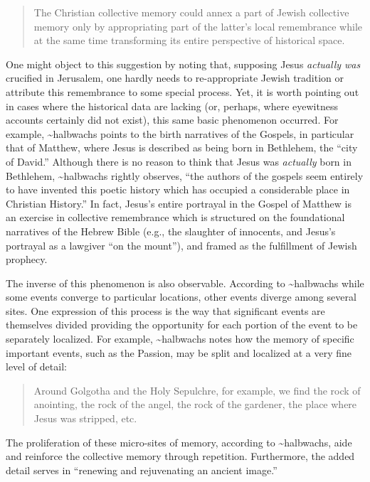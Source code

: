 \begin{quote}
The Christian collective memory could annex a part of Jewish collective
memory only by appropriating part of the latter's local remembrance
while at the same time transforming its entire perspective of historical
space.\autocite[215]{halbwachs1992}
\end{quote}

One might object to this suggestion by noting that, supposing Jesus
\emph{actually was} crucified in Jerusalem, one hardly needs to
re-appropriate Jewish tradition or attribute this remembrance to some
special process. Yet, it is worth pointing out in cases where the
historical data are lacking (or, perhaps, where eyewitness accounts
certainly did not exist), this same basic phenomenon occurred. For
example, \textasciitilde{}halbwachs points to the birth narratives of
the Gospels, in particular that of Matthew, where Jesus is described as
being born in Bethlehem, the ``city of David.'' Although there is no
reason to think that Jesus was \emph{actually} born in Bethlehem,
\textasciitilde{}halbwachs rightly observes, ``the authors of the
gospels seem entirely to have invented this poetic history which has
occupied a considerable place in Christian
History.''\autocite[214]{halbwachs1992} In fact, Jesus's entire
portrayal in the Gospel of Matthew is an exercise in collective
remembrance which is structured on the foundational narratives of the
Hebrew Bible (e.g., the slaughter of innocents, and Jesus's portrayal as
a lawgiver ``on the mount''), and framed as the fulfillment of Jewish
prophecy.

The inverse of this phenomenon is also observable. According to
\textasciitilde{}halbwachs while some events converge to particular
locations, other events diverge among several sites. One expression of
this process is the way that significant events are themselves divided
providing the opportunity for each portion of the event to be separately
localized. For example, \textasciitilde{}halbwachs notes how the memory
of specific important events, such as the Passion, may be split and
localized at a very fine level of detail:

\begin{quote}
Around Golgotha and the Holy Sepulchre, for example, we find the rock of
anointing, the rock of the angel, the rock of the gardener, the place
where Jesus was stripped, etc.\autocite[220]{halbwachs1992}
\end{quote}

The proliferation of these micro-sites of memory, according to
\textasciitilde{}halbwachs, aide and reinforce the collective memory
through repetition. Furthermore, the added detail serves in ``renewing
and rejuvenating an ancient image.''\autocite[220]{halbwachs1992}


